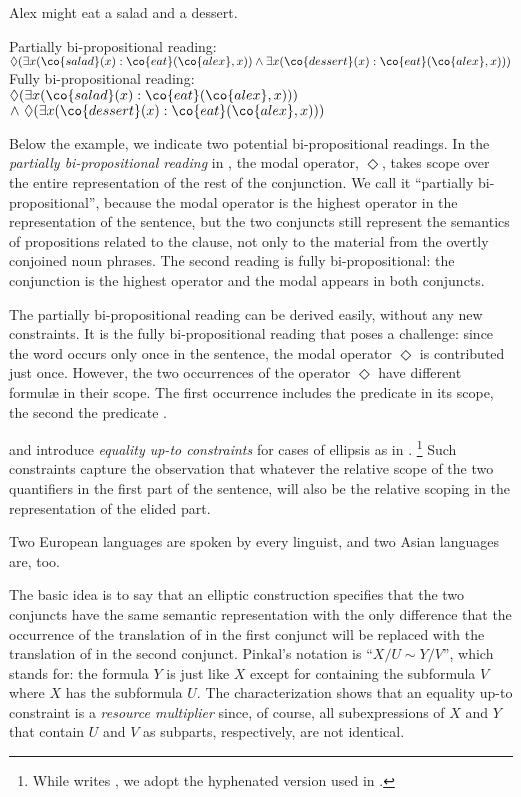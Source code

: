 \documentclass[output=paper]{langsci/langscibook}
\begin{document}
\ea 
\label{ex-notAND-bi}
Alex might eat a salad and a dessert.
\begin{xlist}
\ex \label{ex-part-bi}Partially bi-propositional reading:\\
$\Diamond (\exists x (\co{salad}(x): \co{eat}(\co{alex},x)) \land \exists x (\co{dessert}(x): \co{eat}(\co{alex},x)))$
\ex  \label{ex-full-bi}Fully bi-propositional reading:\\
$\Diamond (\exists x (\co{salad}(x): \co{eat}(\co{alex},x)))$
$\land\ \Diamond (\exists x (\co{dessert}(x): \co{eat}(\co{alex},x)))$
\end{xlist}
\z 

Below the example, we indicate two potential bi-propositional readings. In the \emph{partially bi-propositional reading} in , the modal operator, $\Diamond$, takes scope over the entire representation of the rest of the conjunction. 
We call it ``partially bi-propositional'', because the modal operator is the highest operator in the representation of the sentence, but the two conjuncts still represent the semantics of propositions related to the clause, not only to the material from the overtly conjoined noun phrases.
The second reading is fully bi-propositional: the conjunction is the highest operator and the modal appears in both conjuncts. 

The partially bi-propositional reading can be derived easily, without any new constraints. 
It is the fully bi-propositional reading that poses a challenge: 
since the word  occurs only once in the sentence, the modal operator $\Diamond$ 
is contributed just once. 
However, the two occurrences of the operator $\Diamond$ have different formulæ in their scope.
The first occurrence includes the predicate  in its scope, the second the predicate .

\citet{Niehren:al:97} and \citet{Pinkal:99} introduce \emph{equality up-to constraints} for cases of ellipsis as in .%
\footnote{While \citet{Pinkal:99} writes , we adopt the hyphenated version used in \citet{Niehren:al:97}.} %
Such constraints capture the observation that whatever the relative scope of the two quantifiers in the first part of the sentence,  will also be the relative scoping in the representation of the elided part. 

\ea \label{ex-Pinkal}
Two European languages are spoken by every linguist, and two Asian languages are, too.
\z 

The basic idea is to say that an elliptic construction specifies that the two conjuncts have the same semantic representation with the only difference that the occurrence of the translation of  in the first conjunct will be replaced with the translation of  in the second conjunct. 
Pinkal's notation is ``$X/U \sim Y/V$'', which stands for: the formula $Y$ is just like $X$ except for containing the subformula $V$ where $X$ has the subformula $U$. The characterization shows that an equality up-to constraint is a \emph{resource multiplier} since, of course, all subexpressions of $X$ and $Y$ that contain $U$ and $V$ as subparts, respectively, are not identical.
\end{document}
